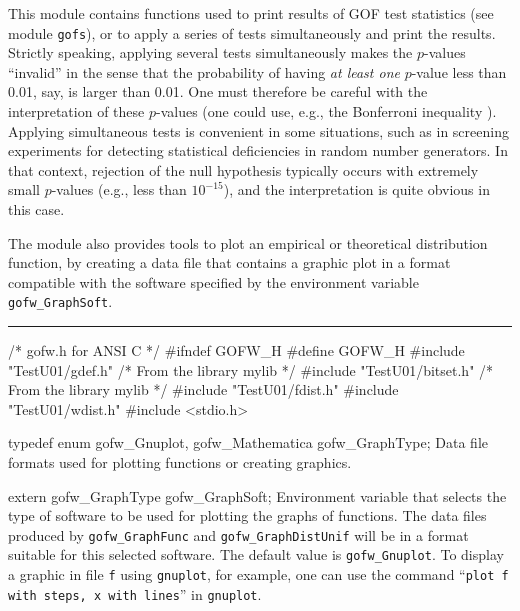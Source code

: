 
This module contains functions used to print results of GOF
test statistics (see module {\tt gofs}), or to apply a series of tests
simultaneously and print the results.
Strictly speaking, applying several tests simultaneously makes the
$p$-values ``invalid'' in the sense that the probability of having
{\em at least one\/} $p$-value less than 0.01, say, is larger than 0.01.
One must therefore be careful with the interpretation of these
$p$-values (one could use, e.g., the Bonferroni inequality \cite{sLAW00a}).
Applying simultaneous tests is convenient in some situations, such as in
screening experiments for detecting statistical deficiencies
in random number generators.  In that context, rejection of the null
hypothesis typically occurs with extremely small $p$-values (e.g., less
than $10^{-15}$), and the interpretation is quite obvious in this case.


The module also provides tools to plot an empirical or
theoretical distribution function, by creating a data file that
contains a graphic plot in a format compatible with the software
specified by the environment variable {\tt gofw\_GraphSoft}.


\bigskip\hrule\medskip
\code\hide
/* gofw.h for ANSI C */
#ifndef GOFW_H
#define GOFW_H
\endhide
#include "TestU01/gdef.h"           /* From the library mylib */
#include "TestU01/bitset.h"         /* From the library mylib */
#include "TestU01/fdist.h"
#include "TestU01/wdist.h"
#include <stdio.h>
\endcode


\code

typedef enum {
   gofw_Gnuplot,
   gofw_Mathematica
   } gofw_GraphType;
\endcode
 \tab  Data file formats used for plotting functions or creating graphics.
 \endtab
\code


extern gofw_GraphType gofw_GraphSoft;
\endcode
 \tab Environment variable that selects the type of software to be
   used for plotting the graphs of functions.
   The data files produced by {\tt gofw\_GraphFunc} and
   {\tt gofw\_GraphDistUnif} will be in a format suitable
   for this selected software.
   The default value is {\tt gofw\_Gnuplot}.
   To display a graphic in file {\tt f} using {\tt gnuplot}, for example,
   one can use the command ``{\tt plot f with steps, x with lines}''
   in {\tt gnuplot}.
 \endtab
\code


